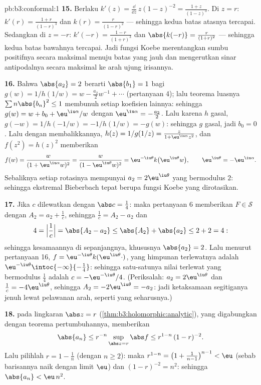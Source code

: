 \begin{solution}{pb:b3:conformal:1}
\textbf{15.} Berlaku $k'(z) = \frac{\dd}{\dd z}\,z(1 - z)^{-2} =
\frac{1 + z}{(1 - z)^3}$. Di $z = r$: $k'(r) =
\frac{1+r}{(1-r)^3}$ dan $k(r) = \frac r{(1-r)^2}$ --- sehingga kedua
batas atasnya tercapai. Sedangkan di $z = -r$: $k'(-r) =
\frac{1-r}{(1+r)^3}$ dan $\abs{k(-r)} = \frac r{(1+r)^2}$
--- sehingga kedua batas bawahnya tercapai. Jadi fungsi Koebe merentangkan
sumbu positifnya secara maksimal menuju batas yang jauh dan
mengerutkan sinar antipodalnya secara maksimal ke arah ujung irisannya.

\textbf{16.} Bahwa $\abs{a_2} = 2$ berarti $\abs{b_1} = 1$ bagi $g(w)
= 1/h(1/w) = w - \frac{a_2}2w^{-1} + \cdots$ (pertanyaan 4);
lalu teorema luasnya $\sum n\abs{b_n}^2 \leq 1$ membunuh setiap
koefisien lainnya: sehingga $g(w) = w + b_0 + \eu^{\iu\alpha}/w$ dengan
$\eu^{\iu\alpha} = -\frac{a_2}2$. Lalu karena $h$ gasal, $g(-w) =
1/h(-1/w) = -1/h(1/w) = -g(w)$: sehingga $g$ gasal, jadi $b_0 = 0$.
Lalu dengan membalikkannya, $h(z) = 1/g(1/z) = \frac{z}{1 +
\eu^{\iu\alpha}z^2}$, dan $f(z^2) = h(z)^2$ memberikan
\[
f(w) = \frac{w}{(1 + \eu^{\iu\alpha}w)^2}
= \frac{w}{(1 - \eu^{\iu\theta}w)^2}
= \eu^{-\iu\theta}k\bigl(\eu^{\iu\theta}w\bigr),
\qquad \eu^{\iu\theta} = -\eu^{\iu\alpha} .
\]
Sebaliknya setiap rotasinya mempunyai $a_2 = 2\eu^{\iu\theta}$ yang
bermodulus $2$: sehingga ekstremal Bieberbach tepat berupa
fungsi Koebe yang dirotasikan.

\textbf{17.} Jika $c$ dilewatkan dengan $\abs c = \frac14$:
maka pertanyaan 6 memberikan $F \in \mathcal S$ dengan $A_2 = a_2 +
\frac1c$, sehingga $\frac1c = A_2 - a_2$ dan
\[
4 = \Bigl|\frac1c\Bigr| = \abs{A_2 - a_2}
\leq \abs{A_2} + \abs{a_2} \leq 2 + 2 = 4 :
\]
sehingga kesamaannya di sepanjangnya, khususnya $\abs{a_2} = 2$. Lalu menurut
pertanyaan 16, $f = \eu^{-\iu\theta}k(\eu^{\iu\theta}\cdot)$,
yang himpunan terlewatnya adalah $\eu^{-\iu\theta}
\intoc{-\infty}{-\frac14}$: sehingga satu-satunya nilai terlewat yang
bermodulus $\frac14$ adalah $c = -\eu^{-\iu\theta}/4$. (Periksalah:
$a_2 = 2\eu^{\iu\theta}$ dan $\frac1c = -4\eu^{\iu\theta}$,
sehingga $A_2 = -2\eu^{\iu\theta} = -a_2$: jadi ketaksamaan
segitiganya jenuh lewat pelawanan arah, seperti yang seharusnya.)

\textbf{18.}  pada lingkaran $\abs z =
r$ (\cref{thm:b3:holomorphic:analytic}), yang digabungkan dengan
teorema pertumbuhannya, memberikan
\[
\abs{a_n} \leq r^{-n}\sup_{\abs z = r}\abs f
\leq r^{1-n}\,(1 - r)^{-2} .
\] Lalu pilihlah $r = 1 - \frac1n$ (dengan $n \geq
2$): maka $r^{1-n} = \bigl(1 + \frac1{n-1}\bigr)^{n-1} < \eu$
(sebab barisannya naik dengan limit $\eu$) dan $(1 - r)^{-2} =
n^2$: sehingga $\abs{a_n} < \eu\,n^2$.


\end{solution}
